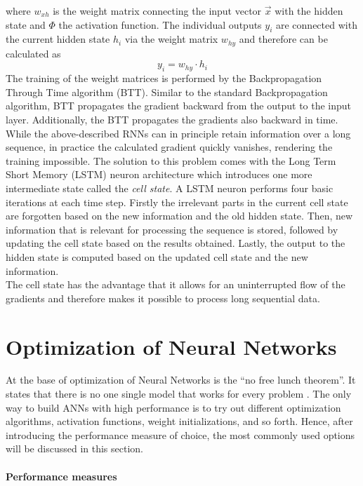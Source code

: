 where $w_{xh}$ is the weight matrix connecting the input vector $\vec{x}$ with the hidden state and $\Phi$ the activation function. The individual outputs $y_i$ are connected with the current hidden state $h_i$ via the weight matrix $w_{hy}$ and therefore can be calculated as
\begin{equation}
y_i = w_{hy} \cdot h_i
\end{equation}
The training of the weight matrices is performed by the Backpropagation Through Time algorithm (BTT). Similar to the standard Backpropagation algorithm, BTT propagates the gradient backward from the output to the input layer. Additionally, the BTT propagates the gradients also backward in time. \\
While the above-described RNNs can in principle retain information over a long sequence, in practice the calculated gradient quickly vanishes, rendering the training impossible. The solution to this problem comes with the Long Term Short Memory (LSTM) neuron architecture which introduces one more intermediate state called the \textit{cell state}. A LSTM neuron performs four basic iterations at each time step. Firstly the irrelevant parts in the current cell state are forgotten based on the new information and the old hidden state. Then, new information that is relevant for processing the sequence is stored, followed by updating the cell state based on the results obtained. Lastly, the output to the hidden state is computed based on the updated cell state and the new information. \\
The cell state has the advantage that it allows for an uninterrupted flow of the gradients and therefore makes it possible to process long sequential data.

\section{Optimization of Neural Networks}
\label{sec:optimization}
At the base of optimization of Neural Networks is the ``no free lunch theorem''. It states that there is no one single model that works for every problem \cite{patterson2017deep}. The only way to build ANNs with high performance is to try out different optimization algorithms, activation functions, weight initializations, and so forth. Hence, after introducing the performance measure of choice, the most commonly used options will be discussed in this section.

\paragraph{Performance measures} \mbox{} \\

